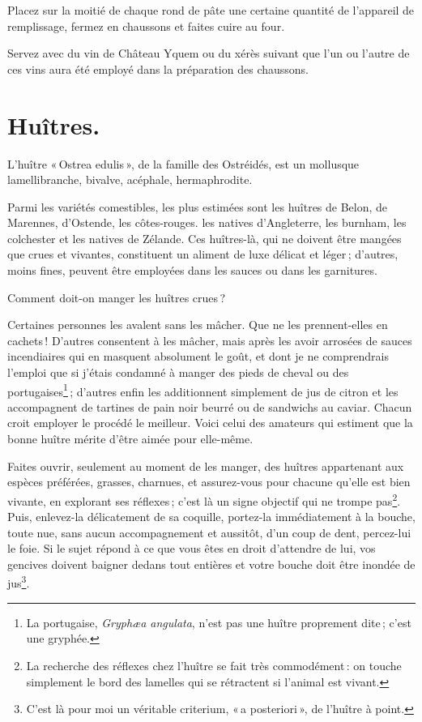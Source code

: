 Placez sur la moitié de chaque rond de pâte une certaine quantité de l'appareil
de remplissage, fermez en chaussons et faites cuire au four.

Servez avec du vin de Château Yquem ou du xérès suivant que l’un ou l'autre
de ces vins aura été employé dans la préparation des chaussons.


\section*{\centering Huîtres.}

L'huître « Ostrea edulis », de la famille des Ostréidés, est un mollusque
lamellibranche, bivalve, acéphale, hermaphrodite.

Parmi les variétés comestibles, les plus estimées sont les huîtres de Belon, de
Marennes, d'Ostende, les côtes-rouges. les natives d'Angleterre, les burnham,
les colchester et les natives de Zélande. Ces huîtres-là, qui ne doivent être
mangées que crues et vivantes, constituent un aliment de luxe délicat et
léger ; d’autres, moins fines, peuvent être employées dans les sauces ou dans
les garnitures.

Comment doit-on manger les huîtres crues ?

Certaines personnes les avalent sans les mâcher. Que ne les prennent-elles en
cachets ! D'autres consentent à les mâcher, mais après les avoir arrosées de
sauces incendiaires qui en masquent absolument le goût, et dont je ne
comprendrais l'emploi que si j'étais condamné à manger des pieds de cheval ou
des portugaises\footnote{La portugaise, \textit{Gryphæa angulata}, n'est pas
une huître proprement dite ; c'est une gryphée.} ; d'autres enfin les
additionnent simplement de jus de citron et les accompagnent de tartines de
pain noir beurré ou de sandwichs au caviar. Chacun croit employer le procédé le
meilleur. Voici celui des amateurs qui estiment que la bonne huître mérite
d'être aimée pour elle-même.

Faites ouvrir, seulement au moment de les manger, des huîtres appartenant aux
espèces préférées, grasses, charnues, et assurez-vous pour chacune qu'elle est
bien vivante, en explorant ses réflexes ; c'est là un signe objectif qui ne
trompe pas\footnote{La recherche des réflexes chez l'huître se fait très
commodément : on touche simplement le bord des lamelles qui se rétractent si
l'animal est vivant.}. Puis, enlevez-la délicatement de sa coquille, portez-la
immédiatement à la bouche, toute nue, sans aucun accompagnement et aussitôt,
d'un coup de dent, percez-lui le foie. Si le sujet répond à ce que vous êtes en
droit d'attendre de lui, vos gencives doivent baigner dedans tout entières et
votre bouche doit être inondée de jus\footnote{C'est là pour moi un véritable
criterium, « a posteriori », de l'huître à point.}.

